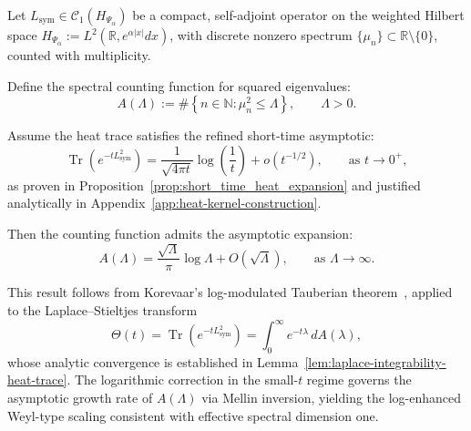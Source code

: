 \begin{lemma}
\label{lem:tauberian_heat_trace_application}
Let \( L_{\mathrm{sym}} \in \mathcal{C}_1(H_{\Psi_\alpha}) \) be a compact, self-adjoint operator on the weighted Hilbert space \( H_{\Psi_\alpha} := L^2(\mathbb{R}, e^{\alpha|x|} dx) \), with discrete nonzero spectrum \( \{ \mu_n \} \subset \mathbb{R} \setminus \{0\} \), counted with multiplicity.

Define the spectral counting function for squared eigenvalues:
\[
A(\Lambda) := \#\left\{ n \in \mathbb{N} : \mu_n^2 \le \Lambda \right\}, \qquad \Lambda > 0.
\]

Assume the heat trace satisfies the refined short-time asymptotic:
\[
\operatorname{Tr}(e^{-t L_{\mathrm{sym}}^2}) = \frac{1}{\sqrt{4\pi t}} \log\left( \frac{1}{t} \right) + o\left( t^{-1/2} \right), \qquad \text{as } t \to 0^+,
\]
as proven in Proposition~\ref{prop:short_time_heat_expansion} and justified analytically in Appendix~\ref{app:heat-kernel-construction}.

Then the counting function admits the asymptotic expansion:
\[
A(\Lambda) = \frac{\sqrt{\Lambda}}{\pi} \log \Lambda + O\left( \sqrt{\Lambda} \right), \qquad \text{as } \Lambda \to \infty.
\]

\medskip
\noindent
This result follows from Korevaar's log-modulated Tauberian theorem~\cite[Ch.~III, §5]{Korevaar2004Tauberian}, applied to the Laplace–Stieltjes transform
\[
\Theta(t) = \operatorname{Tr}(e^{-t L_{\mathrm{sym}}^2}) = \int_0^\infty e^{-t\lambda} \, dA(\lambda),
\]
whose analytic convergence is established in Lemma~\ref{lem:laplace-integrability-heat-trace}. The logarithmic correction in the small-\( t \) regime governs the asymptotic growth rate of \( A(\Lambda) \) via Mellin inversion, yielding the log-enhanced Weyl-type scaling consistent with effective spectral dimension one.
\end{lemma}
